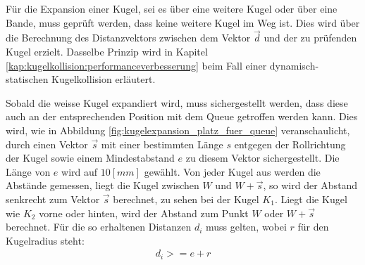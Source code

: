 Für die Expansion einer Kugel, sei es über eine weitere Kugel oder über eine Bande,
muss geprüft werden, dass keine weitere Kugel im Weg ist. Dies wird über die Berechnung
des Distanzvektors zwischen dem Vektor $\vec{d}$ und der zu prüfenden Kugel erzielt. Dasselbe Prinzip wird
in Kapitel \ref{kap:kugelkollision:performanceverbesserung} beim Fall einer dynamisch-statischen Kugelkollision erläutert.



Sobald die weisse Kugel expandiert wird, muss sichergestellt werden, dass diese auch an der entsprechenden Position
mit dem Queue getroffen werden kann. Dies wird, wie in Abbildung \ref{fig:kugelexpansion_platz_fuer_queue} veranschaulicht,
durch einen Vektor $\vec{s}$ mit einer bestimmten Länge $s$ entgegen der Rollrichtung der Kugel sowie einem Mindestabstand
$e$ zu diesem Vektor sichergestellt. Die Länge von $e$ wird auf $10 [mm]$ gewählt. Von jeder Kugel aus
werden die Abstände gemessen, liegt die Kugel zwischen $W$ und $W + \vec{s}$, so wird der Abstand senkrecht zum Vektor $\vec{s}$
berechnet, zu sehen bei der Kugel $K_1$. Liegt die Kugel wie $K_2$ vorne oder hinten, wird der Abstand zum Punkt $W$ oder $W + \vec{s}$
berechnet. Für die so erhaltenen Distanzen $d_i$ muss gelten, wobei $r$ für den Kugelradius steht:
\begin{align}
    d_i >= e + r
\end{align}

